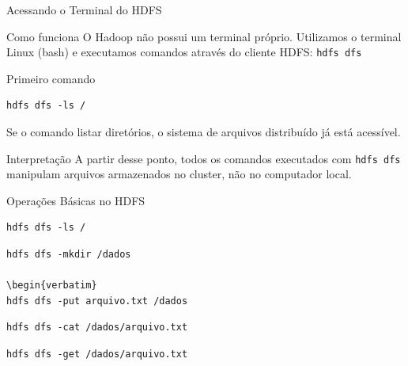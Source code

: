 \documentclass[9pt]{beamer}
\begin{document}
\begin{frame}[fragile]{Acessando o Terminal do HDFS}
 
\begin{block}{Como funciona}
O Hadoop não possui um terminal próprio.
Utilizamos o terminal Linux (bash) e executamos comandos através do cliente HDFS:
\texttt{hdfs dfs}
\end{block}

\begin{block}{Primeiro comando}
\begin{verbatim}
hdfs dfs -ls /
\end{verbatim}
Se o comando listar diretórios, o sistema de arquivos distribuído
já está acessível.
\end{block}

\begin{block}{Interpretação}
A partir desse ponto, todos os comandos executados com
\texttt{hdfs dfs} manipulam arquivos armazenados no cluster,
não no computador local.
\end{block}

\end{frame}
\begin{frame}[fragile]{Operações Básicas no HDFS}

\begin{verbatim}
hdfs dfs -ls /
\end{verbatim}
\begin{verbatim}
hdfs dfs -mkdir /dados

\begin{verbatim}
hdfs dfs -put arquivo.txt /dados
\end{verbatim}

\begin{verbatim}
hdfs dfs -cat /dados/arquivo.txt
\end{verbatim}

\begin{verbatim}
hdfs dfs -get /dados/arquivo.txt
\end{verbatim}

\end{frame}
\end{document}
